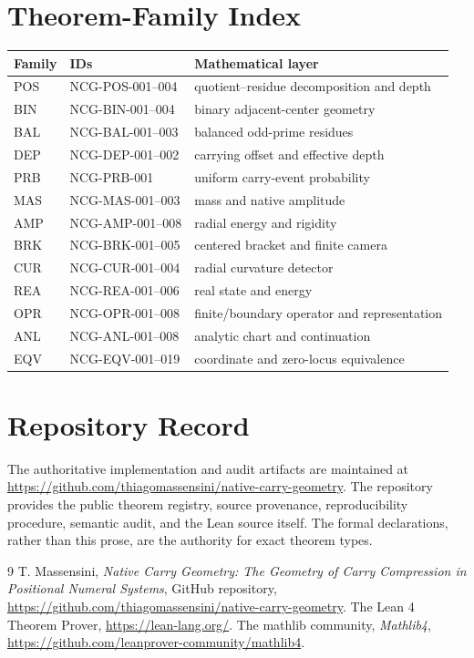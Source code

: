 \documentclass[11pt,a4paper]{article}
\begin{document}
\section{Theorem-Family Index}
\begin{center}
\begin{tabular}{lll}
\toprule
Family & IDs & Mathematical layer\\
\midrule
POS & NCG-POS-001--004 & quotient--residue decomposition and depth\\
BIN & NCG-BIN-001--004 & binary adjacent-center geometry\\
BAL & NCG-BAL-001--003 & balanced odd-prime residues\\
DEP & NCG-DEP-001--002 & carrying offset and effective depth\\
PRB & NCG-PRB-001 & uniform carry-event probability\\
MAS & NCG-MAS-001--003 & mass and native amplitude\\
AMP & NCG-AMP-001--008 & radial energy and rigidity\\
BRK & NCG-BRK-001--005 & centered bracket and finite camera\\
CUR & NCG-CUR-001--004 & radial curvature detector\\
REA & NCG-REA-001--006 & real state and energy\\
OPR & NCG-OPR-001--008 & finite/boundary operator and representation\\
ANL & NCG-ANL-001--008 & analytic chart and continuation\\
EQV & NCG-EQV-001--019 & coordinate and zero-locus equivalence\\
\bottomrule
\end{tabular}
\end{center}
\section{Repository Record}
The authoritative implementation and audit artifacts are maintained at \url{https://github.com/thiagomassensini/native-carry-geometry}. The repository provides the public theorem registry, source provenance, reproducibility procedure, semantic audit, and the Lean source itself. The formal declarations, rather than this prose, are the authority for exact theorem types.

\begin{thebibliography}{9}
 T. Massensini, \emph{Native Carry Geometry: The Geometry of Carry Compression in Positional Numeral Systems}, GitHub repository, \url{https://github.com/thiagomassensini/native-carry-geometry}.
 The Lean 4 Theorem Prover, \url{https://lean-lang.org/}.
 The mathlib community, \emph{Mathlib4}, \url{https://github.com/leanprover-community/mathlib4}.
\end{thebibliography}
\end{document}
